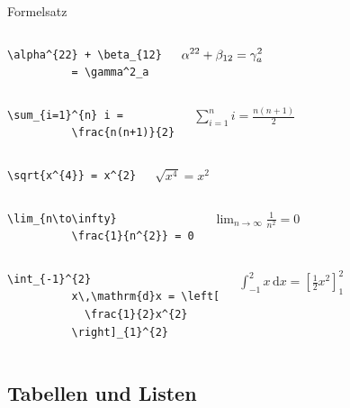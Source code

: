 \begin{Frame}[fragile]{Formelsatz}
  \begin{columns}
    \column{5cm}
      \begin{lstlisting}[gobble=8]
        \alpha^{22} + \beta_{12}
          = \gamma^2_a
      \end{lstlisting}
    \column{4cm}
      $\displaystyle\displaystyle\alpha^{22} + \beta_{12} = \gamma^2_a$
  \end{columns}

  \pause

  \begin{columns}
    \column{5cm}
      \begin{lstlisting}[gobble=8]
        \sum_{i=1}^{n} i =
          \frac{n(n+1)}{2}
      \end{lstlisting}
    \column{4cm}
      $\displaystyle\sum_{i=1}^n i = \frac{n(n+1)}{2}$
  \end{columns}

  \pause

  \begin{columns}
    \column{5cm}
      \begin{lstlisting}[gobble=8]
        \sqrt{x^{4}} = x^{2}
      \end{lstlisting}
    \column{4cm}
      $\displaystyle\sqrt{x^4} = x^2$
  \end{columns}

  \pause

  \begin{columns}
    \column{5cm}
      \begin{lstlisting}[gobble=8]
        \lim_{n\to\infty}
          \frac{1}{n^{2}} = 0
      \end{lstlisting}
    \column{4cm}
      $\displaystyle\lim_{n\to\infty} \frac{1}{n^2} = 0$
  \end{columns}
  
  \pause

  \begin{columns}
    \column{5cm}
      \begin{lstlisting}[gobble=8]
        \int_{-1}^{2}
          x\,\mathrm{d}x = \left[
            \frac{1}{2}x^{2}
          \right]_{1}^{2}
      \end{lstlisting}
    \column{4cm}
      $\displaystyle\int_{-1}^{2} x\,\mathrm{d}x=\left[ \frac{1}{2}x^2 \right]_1^2$
  \end{columns}
\end{Frame}

\subsection{Tabellen und Listen}

